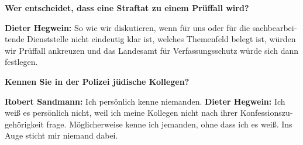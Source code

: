 \begin{otherlanguage}{ngerman}
\textbf{Wer entscheidet, dass eine Straftat zu einem Prüffall wird?}

\textbf{Dieter Hegwein:} So wie wir diskutieren, wenn für uns oder für die sachbearbeitende Dienststelle nicht eindeutig klar ist, welches Themenfeld belegt ist, würden wir Prüffall ankreuzen und das Landesamt für Verfassungsschutz würde sich dann festlegen. 

\textbf{Kennen Sie in der Polizei jüdische Kollegen?}

\textbf{Robert Sandmann:} Ich persönlich kenne niemanden.
\textbf{Dieter Hegwein:} Ich weiß es persönlich nicht, weil ich meine Kollegen nicht nach ihrer Konfessionszugehörigkeit frage. Möglicherweise kenne ich jemanden, ohne dass ich es weiß. Ins Auge sticht mir niemand dabei.

\end{otherlanguage}
